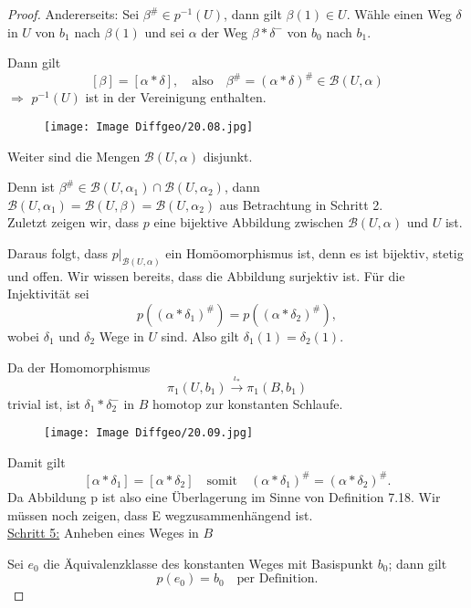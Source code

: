\documentclass[fleqn, 12pt, letterpaper]{article}
\begin{document}
\begin{proof}
Andererseits: Sei \(\beta^{\#} \in p^{-1}(U)\), dann gilt \(\beta(1) \in U\).  
Wähle einen Weg \(\delta\) in \(U\) von \(b_1\) nach \(\beta(1)\) und sei \(\alpha\) der Weg \(\beta * \delta^-\) von \(b_0\) nach \(b_1\).  

Dann gilt  
\[
[\beta] = [\alpha * \delta], \quad \text{also} \quad \beta^{\#} = (\alpha * \delta)^{\#} \in \mathcal{B}(U, \alpha)
\]  
\(\Rightarrow\) \(p^{-1}(U)\) ist in der Vereinigung enthalten.
    \begin{figure}[H]
    \centering
    \texttt{[image: Image Diffgeo/20.08.jpg]}
 \end{figure}

Weiter sind die Mengen \(\mathcal{B}(U, \alpha)\) disjunkt.  

Denn ist \(\beta^\# \in \mathcal{B}(U, \alpha_1) \cap \mathcal{B}(U, \alpha_2)\),  
dann \(\mathcal{B}(U, \alpha_1) = \mathcal{B}(U, \beta) = \mathcal{B}(U, \alpha_2)\) aus Betrachtung in Schritt 2.\\

Zuletzt zeigen wir, dass \(p\) eine bijektive Abbildung zwischen \(\mathcal{B}(U, \alpha)\) und \(U\) ist.  

Daraus folgt, dass \(p|_{\mathcal{B}(U,\alpha)}\) ein Homöomorphismus ist, denn es ist bijektiv, stetig und offen.  
Wir wissen bereits, dass die Abbildung surjektiv ist. Für die Injektivität sei  
\[
p\left((\alpha * \delta_1)^\#\right) = p\left((\alpha * \delta_2)^\#\right),
\]
wobei \(\delta_1\) und \(\delta_2\) Wege in \(U\) sind. Also gilt \(\delta_1(1) = \delta_2(1)\).  

Da der Homomorphismus  
\[
\pi_1(U, b_1) \xrightarrow{\iota_*} \pi_1(B, b_1)
\]
trivial ist, ist \(\delta_1 * \delta_2^-\) in \(B\) homotop zur konstanten Schlaufe.  
    \begin{figure}[H]
    \centering
    \texttt{[image: Image Diffgeo/20.09.jpg]}
 \end{figure}
Damit gilt  
\[
[\alpha * \delta_1] = [\alpha * \delta_2] \quad \text{somit} \quad (\alpha * \delta_1)^\# = (\alpha * \delta_2)^\#.
\]
Da Abbildung p ist also eine Überlagerung im Sinne von Definition 7.18. Wir müssen noch zeigen, dass E wegzusammenhängend ist.\\

\underline{Schritt 5:} Anheben eines Weges in \( B \)

Sei \( e_0 \) die Äquivalenzklasse des konstanten Weges mit Basispunkt \( b_0 \); dann gilt  
\[
p(e_0) = b_0 \quad \text{per Definition}.
\]


\end{proof}
\end{document}
